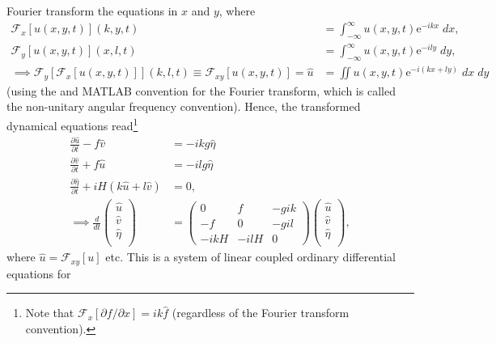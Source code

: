 \documentclass[10pt,reqno]{amsart}
\newcommand{\expe}{{\mathrm e}}
\begin{document}
Fourier transform the equations in $x$ and $y$, where
\begin{align}
{\mathcal F}_x \left[ u (x, y, t) \right] (k,y,t) &= \int_{-\infty}^{\infty} u (x,y,t) \expe ^{-i k x} \; dx ,   \\
{\mathcal F}_y \left[ u (x, y, t) \right] (x,l,t) &= \int_{-\infty}^{\infty} u (x,y,t) \expe ^{-i l y} \; dy ,   \\
\implies {\mathcal F}_y \left[ {\mathcal F}_x \left[ u (x, y, t) \right] \right] (k,l,t) \equiv {\mathcal F}_{xy} \left[ u (x, y, t) \right] = \hat{u} &= \iint u (x,y,t) \expe ^{-i (k x + l y)} \; dx \; dy  
\label{eq:Fourier_def}
\end{align}
(using the \citealt{haberman87} and MATLAB convention for the Fourier transform, which is called the non-unitary angular frequency convention).
Hence, the transformed dynamical equations read\footnote{Note that ${\mathcal F}_x \left[ \partial f / \partial x \right] = i k \hat{f}$ (regardless of the Fourier transform convention).
}
\begin{align}
\frac{\partial \hat{u} }{\partial t }  - f \hat{v}  &= - i k g \hat{\eta}   \\
\frac{\partial \hat{v} }{\partial t }  +f \hat{u}  &= - i l g \hat{\eta}     \\
\frac{\partial \hat{\eta} }{\partial t } + i H \left( k \hat{u}  + l \hat{v}  \right) &= 0   , \\
\implies 
\frac{d}{d t} \begin{pmatrix}
\hat{u} \\
\hat{v} \\
\hat{\eta} \\
\end{pmatrix} & = 
\begin{pmatrix}
        0 & f &  - g i k \\
      - f  & 0 &  - g i l \\
- i k H &  - i l H &  0
\end{pmatrix} 
\begin{pmatrix}
\hat{u} \\
\hat{v} \\
\hat{\eta} \\
\end{pmatrix} ,  
\end{align}
where $\hat{u} = {\mathcal F}_{xy}[ u ]$ etc.
This is a system of linear coupled ordinary differential equations for 
\end{document}
